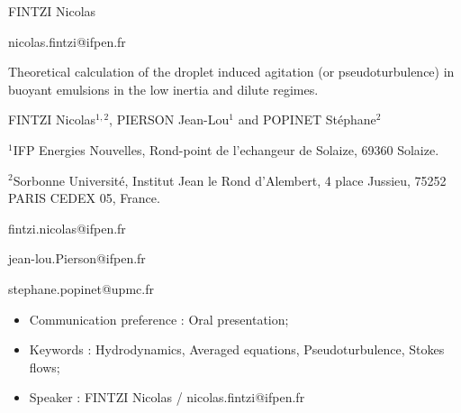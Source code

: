 \documentclass[a4paper,11pt]{article}
\author{\large GAMET Lionel}
\author{\large PIERSON Jean-Lou}
\author{\large GAMET Lionel$^1$, PIERSON Jean-Lou$^2$ and FINTZI Nicolas$^3$}
\theoremstyle{mytheoremstyle}
\theoremstyle{mytheoremstyle}
\theoremstyle{myproblemstyle}
\begin{document}
\begin{flushright}
    FINTZI Nicolas
    
    nicolas.fintzi@ifpen.fr
\end{flushright}
\begin{center}
    \vspace{10pt}
    {\Large Theoretical calculation of the droplet induced agitation (or pseudoturbulence) in buoyant emulsions in the low inertia and dilute regimes.}\\
    \vspace{10pt}

    \vspace{15pt}
    {\large FINTZI Nicolas$^{1,2}$, PIERSON Jean-Lou$^1$ and POPINET St\'ephane$^2$}
\end{center}

\begin{flushleft}
$^{1}$\large IFP Energies Nouvelles, Rond-point de l’echangeur de Solaize, 69360 Solaize.

$^{2}$\large Sorbonne Universit\'e, Institut Jean le Rond d'Alembert, 4 place Jussieu, 75252 PARIS CEDEX 05, France.

fintzi.nicolas@ifpen.fr 

jean-lou.Pierson@ifpen.fr

stephane.popinet@upmc.fr


\end{flushleft}
\begin{itemize}
\item Communication preference : Oral presentation;
\item Keywords : Hydrodynamics, Averaged equations, Pseudoturbulence, Stokes flows;
\item Speaker : FINTZI Nicolas / nicolas.fintzi@ifpen.fr
\end{itemize}


\vspace{15pt}
\end{document}
